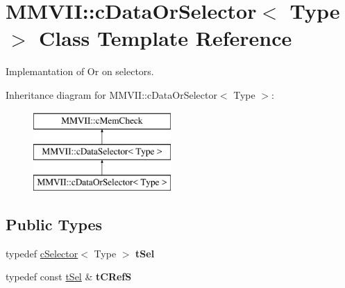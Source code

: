 \hypertarget{classMMVII_1_1cDataOrSelector}{}\section{M\+M\+V\+II\+:\+:c\+Data\+Or\+Selector$<$ Type $>$ Class Template Reference}
\label{classMMVII_1_1cDataOrSelector}


Implemantation of Or on selectors.  


Inheritance diagram for M\+M\+V\+II\+:\+:c\+Data\+Or\+Selector$<$ Type $>$\+:\begin{figure}[H]
\begin{center}
\leavevmode
\includegraphics[height=3.000000cm]{classMMVII_1_1cDataOrSelector}
\end{center}
\end{figure}
\subsection*{Public Types}
\begin{DoxyCompactItemize}
\item 
typedef \hyperlink{classMMVII_1_1cSelector}{c\+Selector}$<$ Type $>$ {\bfseries t\+Sel}\hypertarget{classMMVII_1_1cDataOrSelector_abb45243a88a8407827b3eec468f037c6}{}\label{classMMVII_1_1cDataOrSelector_abb45243a88a8407827b3eec468f037c6}

\item 
typedef const \hyperlink{classMMVII_1_1cSelector}{t\+Sel} \& {\bfseries t\+C\+RefS}\hypertarget{classMMVII_1_1cDataOrSelector_a48738497012db9735118266ebadb03e3}{}\label{classMMVII_1_1cDataOrSelector_a48738497012db9735118266ebadb03e3}

\end{DoxyCompactItemize}
